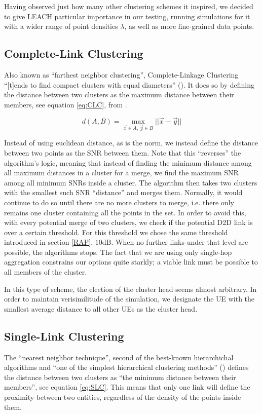 Having observed just how many other clustering schemes it inspired, we decided to give LEACH particular importance in our testing, running simulations for it with a wider range of point densities $\lambda$, as well as more fine-grained data points.


\subsection{Complete-Link Clustering}\label{CLC}
Also known as ``farthest neighbor clustering'', Complete-Linkage Clustering ``[t]ends to find compact clusters with equal diameters'' (\cite{Everitt2011}). It does so by defining the distance between two clusters as the maximum distance between their members, see equation \ref{eq:CLC}, from \cite{Shalizi2009}. 

\begin{equation}\label{eq:CLC}
d(A,B) = \max_{\vec{x} \in A,\,\vec{y} \in B} ||\vec{x}  - \vec{y}||
\end{equation}


Instead of using euclidean distance, as is the norm, we instead define the distance between two points as the SNR between them. Note that this ``reverses'' the algorithm's logic, meaning that instead of finding the minimum distance among all maximum distances in a cluster for a merge, we find the maximum SNR among all minimum SNRs inside a cluster. The algorithm then takes two clusters with the smallest such SNR ``distance'' and merges them.  Normally, it would continue to do so until there are no more clusters to merge, i.e. there only remains one cluster containing all the points in the set. In order to avoid this, with every potential merge of two clusters, we check if the potential D2D link is over a certain threshold. For this threshold we chose the same threshold introduced in section \ref{RAP}, $10 \text{dB}$. When no further links under that level are possible, the algorithms stops. The fact that we are using only single-hop aggregation constrains our options quite starkly; a viable link must be possible to all members of the cluster.

In this type of scheme, the election of the cluster head seems almost arbitrary. In order to maintain verisimilitude of the simulation, we designate the UE with the smallest average distance to all other UEs as the cluster head.

\subsection{Single-Link Clustering}\label{SLC}
The ``nearest neighbor technique'', second of the best-known hierarchichal algorithms and ``one of the simplest hierarchical clustering methods'' (\cite{Everitt2011}) defines the distance between two clusters as ``the minimum distance between their members'', see equation \ref{eq:SLC}. This means that only one link will define the proximity between two entities, regardless of the density of the points inside them.

